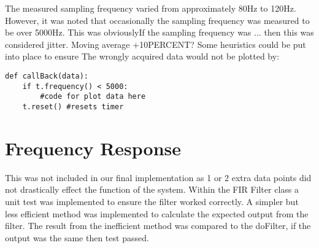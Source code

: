\documentclass{article}
\begin{document}
\newline 
The measured sampling frequency varied from approximately 80Hz to 120Hz. However, it was noted that occasionally the sampling frequency was measured to be over 5000Hz. This was obviouslyIf the sampling frequency was ... then this was considered jitter. Moving average +10PERCENT? Some heuristics could be put into place to ensure The wrongly acquired data would not be plotted by:
\lstset{language=Python}
\begin{lstlisting}
def callBack(data):
    if t.frequency() < 5000:
        #code for plot data here
    t.reset() #resets timer
\end{lstlisting}
\section{Frequency Response}
This was not included in our final implementation as 1 or 2 extra data points did not drastically effect the function of the system.
Within the FIR Filter class a unit test was implemented to ensure the filter worked correctly. A simpler but less efficient method was implemented to calculate the expected output from the filter. The result from the inefficient method was compared to the doFilter, if the output was the same then test passed.
\end{document}
